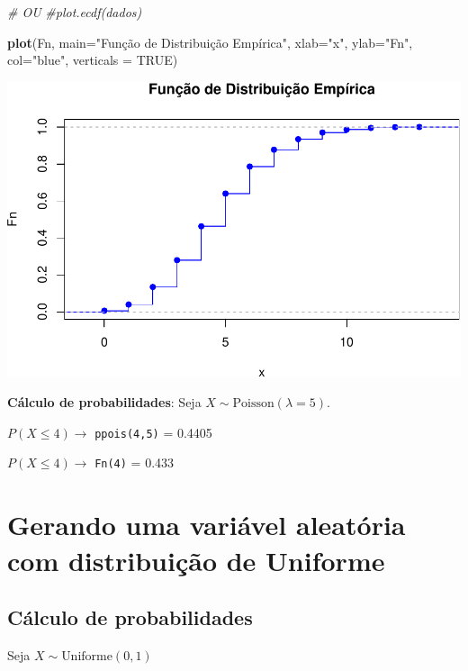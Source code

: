 \documentclass[
]{book}
\newenvironment{Shaded}{\begin{snugshade}}{\end{snugshade}}
\newcommand{\AttributeTok}[1]{\textcolor[rgb]{0.13,0.29,0.53}{#1}}
\newcommand{\CommentTok}[1]{\textcolor[rgb]{0.56,0.35,0.01}{\textit{#1}}}
\newcommand{\ConstantTok}[1]{\textcolor[rgb]{0.56,0.35,0.01}{#1}}
\newcommand{\FunctionTok}[1]{\textcolor[rgb]{0.13,0.29,0.53}{\textbf{#1}}}
\newcommand{\NormalTok}[1]{#1}
\newcommand{\StringTok}[1]{\textcolor[rgb]{0.31,0.60,0.02}{#1}}
\begin{document}
\begin{Shaded}
\begin{Highlighting}[]
\CommentTok{\# OU}
\CommentTok{\#plot.ecdf(dados)}

\FunctionTok{plot}\NormalTok{(Fn, }\AttributeTok{main=}\StringTok{"Função de Distribuição Empírica"}\NormalTok{,}
     \AttributeTok{xlab=}\StringTok{"x"}\NormalTok{,}
     \AttributeTok{ylab=}\StringTok{"Fn"}\NormalTok{,}
     \AttributeTok{col=}\StringTok{"blue"}\NormalTok{,}
     \AttributeTok{verticals =} \ConstantTok{TRUE}\NormalTok{)}
\end{Highlighting}
\end{Shaded}

\includegraphics{meuLivro2_files/figure-latex/unnamed-chunk-122-2.pdf}

\textbf{Cálculo de probabilidades}: Seja \(X\sim\text{Poisson}(\lambda=5)\).

\(P(X\leq 4) \to\) \texttt{ppois(4,5)} = 0.4405

\(P(X \leq 4) \to\) \texttt{Fn(4)} = 0.433

\section{Gerando uma variável aleatória com distribuição de Uniforme}\label{gerando-uma-variuxe1vel-aleatuxf3ria-com-distribuiuxe7uxe3o-de-uniforme}

\subsection{Cálculo de probabilidades}\label{cuxe1lculo-de-probabilidades-2}

Seja \(X\sim \text{Uniforme}(0,1)\)
\end{document}
